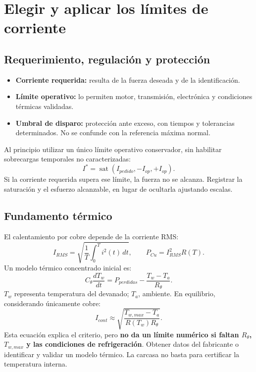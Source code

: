 \documentclass[11pt,a4paper]{article}
\newcommand{\sat}{\operatorname{sat}}
\begin{document}
\section{Elegir y aplicar los límites de corriente}
\subsection{Requerimiento, regulación y protección}
\begin{itemize}
\item \textbf{Corriente requerida:} resulta de la fuerza deseada y de la identificación.
\item \textbf{Límite operativo:} lo permiten motor, transmisión, electrónica y condiciones térmicas validadas.
\item \textbf{Umbral de disparo:} protección ante exceso, con tiempos y tolerancias determinados. No se confunde con la referencia máxima normal.
\end{itemize}
Al principio utilizar un único límite operativo conservador, sin habilitar sobrecargas temporales no caracterizadas:
\begin{equation}
I^*=\sat(I_{pedido},-I_{op},+I_{op}).
\end{equation}
Si la corriente requerida supera ese límite, la fuerza no se alcanza. Registrar la saturación y el esfuerzo alcanzable, en lugar de ocultarla ajustando escalas.

\subsection{Fundamento térmico}
El calentamiento por cobre depende de la corriente RMS:
\begin{equation}
I_{RMS}=\sqrt{\frac1T\int_0^T i^2(t)\,dt},\qquad
P_{Cu}=I_{RMS}^2R(T).
\end{equation}
Un modelo térmico concentrado inicial es:
\begin{equation}
C_\theta\frac{dT_w}{dt}=P_{perdidas}-\frac{T_w-T_a}{R_\theta}.
\end{equation}
$T_w$ representa temperatura del devanado; $T_a$, ambiente. En equilibrio, considerando únicamente cobre:
\begin{equation}
I_{cont}\approx\sqrt{\frac{T_{w,max}-T_a}{R(T_w)R_\theta}}.
\end{equation}
Esta ecuación explica el criterio, pero \textbf{no da un límite numérico si faltan $R_\theta$, $T_{w,max}$ y las condiciones de refrigeración}. Obtener datos del fabricante o identificar y validar un modelo térmico. La carcasa no basta para certificar la temperatura interna.
\end{document}
